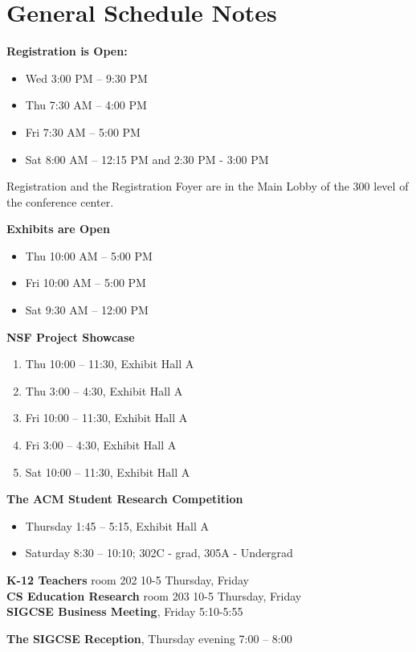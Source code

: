 \newpage
{\centering
\section*{General Schedule Notes}
}

\noindent
\textbf{Registration is Open:}
\begin{itemize}
	\item Wed 3:00 PM -- 9:30 PM
	\item Thu 7:30 AM -- 4:00 PM
	\item Fri 7:30 AM -- 5:00 PM
	\item Sat 8:00 AM -- 12:15 PM and 2:30 PM - 3:00 PM
\end{itemize}
\noindent Registration and the Registration Foyer are in the Main Lobby of the 300 level of the conference center.

\noindent
\textbf{Exhibits are Open }
\begin{itemize}
\item Thu 10:00 AM -- 5:00 PM
\item Fri 10:00 AM -- 5:00 PM
\item Sat 9:30 AM -- 12:00 PM
\end{itemize}

\noindent
\textbf{NSF Project Showcase}
\begin{enumerate}
\item Thu 10:00 -- 11:30, Exhibit Hall A
\item Thu 3:00 -- 4:30, Exhibit Hall A
\item Fri 10:00 -- 11:30, Exhibit Hall A
\item Fri 3:00 -- 4:30, Exhibit Hall A
\item Sat 10:00 -- 11:30, Exhibit Hall A
\end{enumerate}

\noindent
\textbf{The ACM Student Research Competition}
\begin{itemize}
	\item Thursday 1:45 -- 5:15, Exhibit Hall A
	\item Saturday 8:30 -- 10:10; 302C - grad, 305A - Undergrad
\end{itemize}

\noindent
\textbf{K-12 Teachers} room 202 10-5 Thursday, Friday \\
\textbf{CS Education Research} room 203  10-5 Thursday, Friday \\
\textbf{SIGCSE Business Meeting}, Friday 5:10-5:55

\noindent
\textbf{The SIGCSE Reception}, Thursday evening  7:00 -- 8:00

\newpage